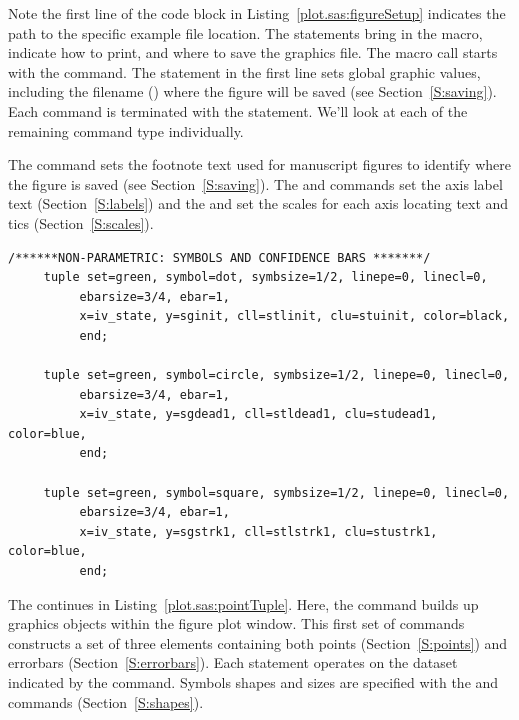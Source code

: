 \documentclass[nojss]{jss}\usepackage[]{graphicx}\usepackage[]{color}
\begin{document}
Note the first line of the code block in Listing~\ref{plot.sas:figureSetup} indicates the path to the specific example file location. The  statements bring in the  macro, indicate how to print, and where to save the graphics file. The  macro call starts with the  command. The  statement in the first line sets global graphic values, including the filename () where the figure will be saved (see Section~\ref{S:saving}). Each  command is terminated with the  statement. We'll look at each of the remaining command type individually.

The  command sets the footnote text used for manuscript figures to identify where the figure is saved (see Section~\ref{S:saving}). The  and  commands set the axis label text (Section~\ref{S:labels}) and the  and  set the scales for each axis locating text and tics (Section~\ref{S:scales}).

\begin{lstlisting}[float,floatplacement=!htpb, caption={plot.sas commands: points and errorbar tuple statements.}, label={plot.sas:pointTuple}]
     /******NON-PARAMETRIC: SYMBOLS AND CONFIDENCE BARS *******/
     tuple set=green, symbol=dot, symbsize=1/2, linepe=0, linecl=0,
          ebarsize=3/4, ebar=1,
          x=iv_state, y=sginit, cll=stlinit, clu=stuinit, color=black, 
          end;

     tuple set=green, symbol=circle, symbsize=1/2, linepe=0, linecl=0,
          ebarsize=3/4, ebar=1,
          x=iv_state, y=sgdead1, cll=stldead1, clu=studead1, color=blue, 
          end;
          
     tuple set=green, symbol=square, symbsize=1/2, linepe=0, linecl=0,
          ebarsize=3/4, ebar=1,
          x=iv_state, y=sgstrk1, cll=stlstrk1, clu=stustrk1, color=blue, 
          end;
\end{lstlisting}
The  continues in Listing~\ref{plot.sas:pointTuple}. Here, the  command builds up graphics objects within the figure plot window. This first set of  commands constructs a set of three elements containing both points (Section~\ref{S:points}) and errorbars (Section~\ref{S:errorbars}). Each  statement operates on the dataset indicated by the  command. Symbols shapes and sizes are specified with the  and  commands (Section~\ref{S:shapes}).
\end{document}
